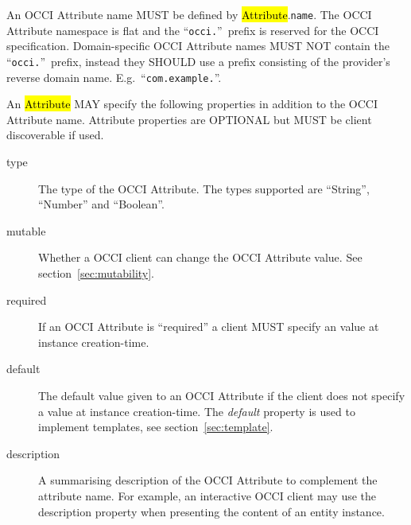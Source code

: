 \documentclass[10pt,a4paper]{article}
\begin{document}

An OCCI Attribute name MUST be defined by \hl{Attribute}.{\tt name}. The
OCCI Attribute namespace is flat and the ``\texttt{occi.}''~prefix is reserved
for the OCCI specification.
Domain-specific OCCI Attribute names MUST NOT contain the
``\texttt{occi.}''~prefix, instead they SHOULD use a prefix consisting of the
provider's reverse domain name. E.g.~``\texttt{com.example.}''.

An \hl{Attribute} MAY specify the following properties in addition to the OCCI
Attribute name. Attribute properties are OPTIONAL but MUST be client
discoverable if used.
\begin{description}
\item[type] The type of the OCCI Attribute. The types supported are ``String'',
  ``Number'' and ``Boolean''.

\item[mutable] Whether a OCCI client can change the OCCI Attribute value. See
  section~\ref{sec:mutability}.

\item[required] If an OCCI Attribute is ``required'' a client MUST specify an
  value at instance creation-time.

\item[default] The default value given to an OCCI Attribute if the client does
  not specify a value at instance creation-time.  The {\em default} property is
  used to implement templates, see section~\ref{sec:template}.

\item[description] A summarising description of the OCCI Attribute to
  complement the attribute name. For example, an interactive OCCI client may
  use the description property when presenting the content of an entity
  instance.
\end{description}
\end{document}
